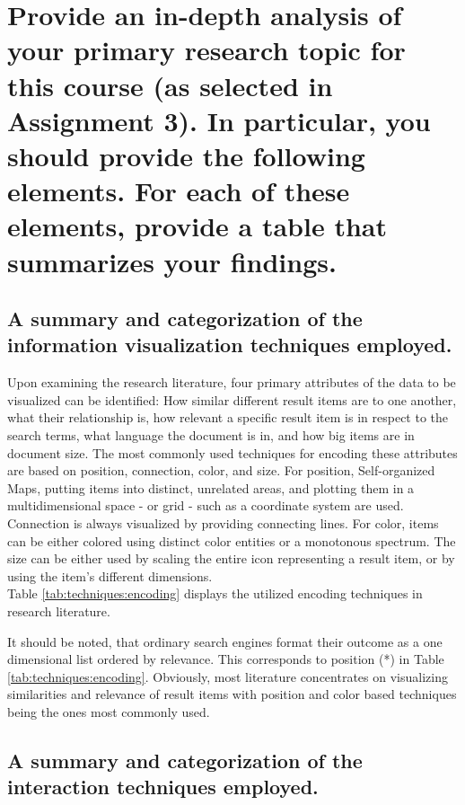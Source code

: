 \section{Provide an in-depth analysis of your primary research topic for this course
(as selected in Assignment 3). In particular, you should provide the following elements. For each of these elements, provide a table that summarizes your findings.}

\subsection{A summary and categorization of the information visualization techniques employed.}
Upon examining the research literature, four primary attributes of the data to be visualized can be identified: How similar different result items are to one another, what their relationship is, how relevant a specific result item is in respect to the search terms, what language the document is in, and how big items are in document size. The most commonly used techniques for encoding these attributes are based on position, connection, color, and size. For position, Self-organized Maps, putting items into distinct, unrelated areas, and plotting them in a multidimensional space - or grid - such as a coordinate system are used. Connection is always visualized by providing connecting lines. For color, items can be either colored using distinct color entities or a monotonous spectrum. The size can be either used by scaling the entire icon representing a result item, or by using the item's different dimensions. \\
Table \ref{tab:techniques:encoding} displays the utilized encoding techniques in research literature.
	
It should be noted, that ordinary search engines format their outcome as a one dimensional list ordered by relevance. This corresponds to position (*) in Table \ref{tab:techniques:encoding}. Obviously, most literature concentrates on visualizing similarities and relevance of result items with position and color based techniques being the ones most commonly used.

\subsection{A summary and categorization of the interaction techniques employed.}

